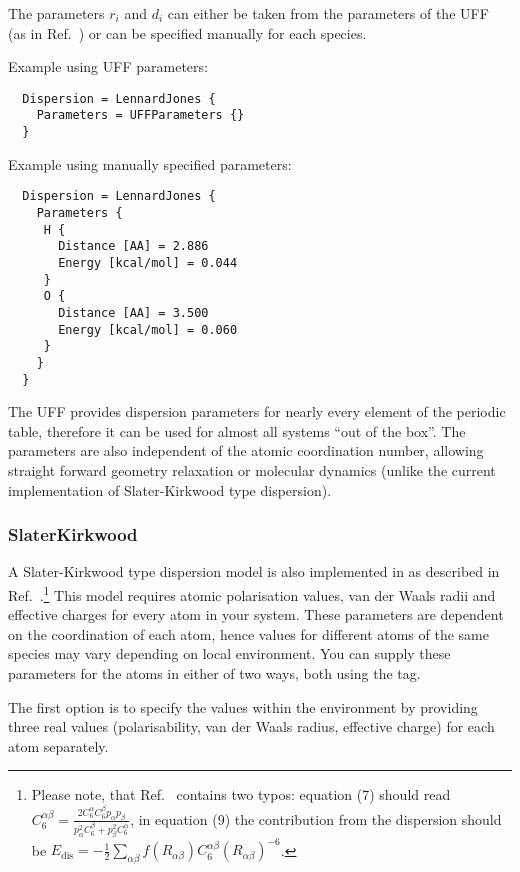 The parameters $r_i$ and $d_i$ can either be taken from the parameters
of the UFF~\cite{rappe-JACS-114-10024} (as in
Ref.~\cite{zhechkov-JCTC-1-841}) or can be specified manually for each
species.

Example using UFF parameters:\invparskip
\begin{verbatim}
  Dispersion = LennardJones {
    Parameters = UFFParameters {}
  }
\end{verbatim}

Example using manually specified parameters:\invparskip
\begin{verbatim}
  Dispersion = LennardJones {
    Parameters {
     H {
       Distance [AA] = 2.886
       Energy [kcal/mol] = 0.044
     }
     O {
       Distance [AA] = 3.500
       Energy [kcal/mol] = 0.060
     }
    }
  }
\end{verbatim}

The UFF provides dispersion parameters for nearly every element of the
periodic table, therefore it can be used for almost all systems
``out of the box''. The parameters are also independent of the atomic
coordination number, allowing straight forward geometry relaxation or
molecular dynamics (unlike the current implementation of
Slater-Kirkwood type dispersion).


\subsubsection{SlaterKirkwood}
\label{sec:dftbp.SlaterKirkwood}
\label{sec:SlaterKirkwood}

A Slater-Kirkwood type dispersion model is also implemented in
\dftbp{} as described in
Ref.~\cite{elstner-jcp-114-5149}.\footnote{Please note, that
  Ref.~\cite{elstner-jcp-114-5149} contains two typos: equation (7)
  should read $C_6^{\alpha\beta} = \frac{2 C_6^\alpha C_6^\beta
    p_\alpha p_\beta}{p_\alpha^2 C_6^\beta + p_\beta^2 C_6^\alpha}$,
  in equation (9) the contribution from the dispersion should be
  $E_{\text{dis}} = -\frac{1}{2} \sum_{\alpha\beta}
  f(R_{\alpha\beta})C_6^{\alpha\beta}(R_{\alpha\beta})^{-6}$.}
This model requires atomic polarisation
values, van der Waals radii and effective charges for every atom in
your system. These parameters are dependent on the coordination of
each atom, hence values for different atoms of the same species may
vary depending on local environment.  You can supply these parameters
for the atoms in either of two ways, both using the
 tag.

The first option is to specify the values within the
 environment by providing three real values
(polarisability, van der Waals radius, effective charge) for each atom
separately.

